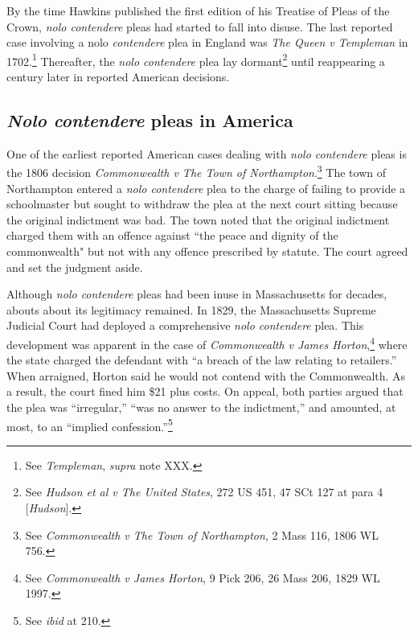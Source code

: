 By the time Hawkins published the first edition of his Treatise of Pleas of the Crown, \textit{nolo contendere} pleas had started to fall into disuse. The last reported case involving a nolo\textit{ contendere} plea in England was \textit{The Queen v Templeman} in 1702.\footnote{See \textit{Templeman}, \textit{supra} note XXX.} Thereafter, the \textit{nolo contendere} plea lay dormant\footnote{See \textit{Hudson et al v The United States}, 272 US 451, 47 SCt 127 at para 4 [\textit{Hudson}].} until reappearing a century later in reported American decisions.

\subsection{\textit{Nolo contendere} pleas in America}

One of the earliest reported American cases dealing with \textit{nolo contendere} pleas is the 1806 decision \textit{Commonwealth v The Town of Northampton}.\footnote{See \textit{Commonwealth v The Town of Northampton}, 2 Mass 116, 1806 WL 756.} The town of Northampton entered a \textit{nolo contendere} plea to the charge of failing to provide a schoolmaster but sought to withdraw the plea at the next court sitting because the original indictment was bad. The town noted that the original indictment charged them with an offence against ``the peace and dignity of the commonwealth" but not with any offence prescribed by statute. The court agreed and set the judgment aside.

Although \textit{nolo contendere} pleas had been inuse in Massachusetts for decades, abouts about its legitimacy remained. In 1829, the Massachusetts Supreme Judicial Court had deployed a comprehensive \textit{nolo contendere} plea. This development was apparent in the case of \textit{Commonwealth v James Horton},\footnote{See \textit{Commonwealth v James Horton}, 9 Pick 206, 26 Mass 206, 1829 WL 1997.} where the state charged the defendant with ``a breach of the law relating to retailers.'' When arraigned, Horton said he would not contend with the Commonwealth. As a result, the court fined him \$21 plus costs. On appeal, both parties argued that the plea was ``irregular,'' ``was no answer to the indictment,'' and amounted, at most, to an ``implied confession.''\footnote{See \textit{ibid} at 210.} 

